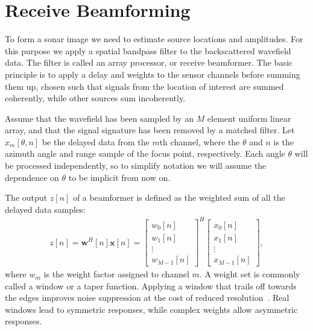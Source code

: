 \documentclass[10pt,journal,draftclsnofoot,onecolumn]{IEEEtran}
\newcommand\bmat[1]{\begin{bmatrix}#1\end{bmatrix}}
\renewcommand\H{^{\scriptscriptstyle H}}
\renewcommand\vec[1]{\boldsymbol{#1}}
\newcommand\1{\vec 1}
\newcommand*\w{\vec w}
\newcommand*\x{\vec x}
\begin{document}
% 
% 


\newpage
\section{Receive Beamforming}\label{sec:beamforming}

To form a sonar image we need to estimate source locations and amplitudes. For this purpose we apply a spatial bandpass filter to the backscattered wavefield data. The filter is called an array processor, or receive beamformer. The basic principle is to apply a delay and weights to the sensor channels before summing them up, chosen such that signals from the location of interest are summed coherently, while other sources sum incoherently.

Assume that the wavefield has been sampled by an $M$ element uniform linear array, and that the signal signature has been removed by a matched filter. Let $x_m[\theta,n]$ be the delayed data from the $m$th channel, where the $\theta$ and $n$ is the azimuth angle and range sample of the focus point, respectively. Each angle $\theta$ will be processed independently, so to simplify notation we will assume the dependence on $\theta$ to be implicit from now on. 

The output $z[n]$ of a beamformer is defined as the weighted sum of all the delayed data samples:
%
\begin{align}
z[n] = \w\H[n]\x[n] = \bmat{w_0[n]\\w_1[n]\\\vdots\\w_{M-1}[n]}^H \bmat{x_0[n]\\x_1[n]\\\vdots\\x_{M-1}[n]},\label{eq:beamformer_output}
\end{align}
%
where $w_m$ is the weight factor assigned to channel $m$. A weight set is commonly called a window or a taper function. Applying a window that trails off towards the edges improves noise suppression at the cost of reduced resolution~\cite{Harris1978}. Real windows lead to symmetric responses, while complex weights allow asymmetric responses.
\end{document}
